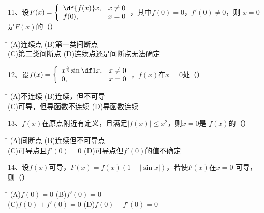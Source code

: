 \bigskip

11、设$F(x)=\left\{\begin{array}{ll}
\df{f(x)}x,& x\ne0\\ f(0),& x=0
\end{array}\right.$，其中$f(0)=0$，$f'(0)\ne 0$，则
$x=0$是$F(x)$的（\quad）%
\begin{tabbing}
	\hspace{8cm}\=\kill
	\quad\quad\quad(A)\;连续点 \> 
	(B)\;第一类间断点 \\ 
	\quad\quad\quad(C)\;第二类间断点\>
	(D)\;连续点还是间断点无法确定
\end{tabbing}

\bigskip

12、设$f(x)=\left\{\begin{array}{ll}
x^{\frac53}\sin\df1x,& x\ne0\\ 0,& x=0
\end{array}\right.$，$f(x)$在$x=0$处（\quad）%
\begin{tabbing}
	\hspace{8cm}\=\kill
	\quad\quad\quad(A)\;不连续 \> 
	(B)\;连续，但不可导 \\ 
	\quad\quad\quad(C)\;可导，但导函数不连续\>
	(D)\;导函数连续
\end{tabbing}

\bigskip

13、$f(x)$在原点附近有定义，且满足$|f(x)|\leq x^2$，则$x=0$是
$f(x)$的（\quad）%
\begin{tabbing}
	\hspace{8cm}\=\kill
	\quad\quad\quad(A)\;间断点 \> 
	(B)\;连续但不可导点 \\ 
	\quad\quad\quad(C)\;可导点且$f'(0)=0$\>
	(D)\;可导点但$f'(0)$的值不确定
\end{tabbing}

\bigskip

14、设$f(x)$可导，$F(x)=f(x)(1+|\sin x|)$，若使$F(x)$在$x=0$
可导，则（\quad）%
\begin{tabbing}
	\hspace{8cm}\=\kill
	\quad\quad\quad(A)\;$f(0)=0$ \> 
	(B)\;$f'(0)=0$ \\ 
	\quad\quad\quad(C)\;$f(0)+f'(0)=0$\>
	(D)\;$f(0)-f'(0)=0$
\end{tabbing}


